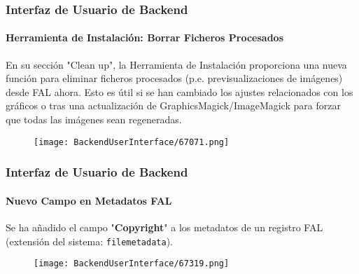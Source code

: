 \begin{frame}[fragile]
	\frametitle{Interfaz de Usuario de Backend}
	\framesubtitle{Herramienta de Instalación: Borrar Ficheros Procesados}

	En su sección "Clean up", la Herramienta de Instalación proporciona una nueva función para eliminar
	ficheros procesados (p.e. previsualizaciones de imágenes) desde FAL ahora.\newline
	Esto es útil si se han cambiado los ajustes relacionados con los gráficos o tras una actualización de
	GraphicsMagick/ImageMagick para forzar que todas las imágenes sean regeneradas.

	\begin{figure}
		\texttt{[image: BackendUserInterface/67071.png]}
	\end{figure}

\end{frame}

\begin{frame}[fragile]
	\frametitle{Interfaz de Usuario de Backend}
	\framesubtitle{Nuevo Campo en Metadatos FAL}

	Se ha añadido el campo "\textbf{Copyright}" a los metadatos de un registro FAL
	(extensión del sistema: \texttt{filemetadata}).

	\begin{figure}
		\texttt{[image: BackendUserInterface/67319.png]}
	\end{figure}

\end{frame}

